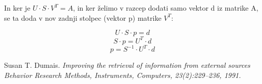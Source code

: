 \documentclass{article}
\begin{document}
In ker je \( U \cdot S \cdot V^{T} = A \), in ker želimo v razcep dodati samo vektor d iz matrike A, se ta doda v nov zadnji stolpec (vektor p) matrike \(  V^{T} \):

\[ 
U \cdot S \cdot p = d \]
\[ S \cdot p = U^{T} \cdot d   \]
\[ p = S^{-1} \cdot  U^{T} \cdot d  \]

\begin{thebibliography}{9}
Susan T. Dumais. 
\textit{ Improving the retrieval of information from external sources Behavior Research Methods, Instruments,  Computers, 23(2):229–236, 1991.}
\end{thebibliography}
\end{document}
